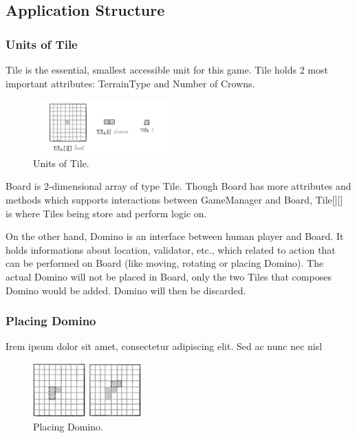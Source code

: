 \documentclass[conference]{IEEEtran}
\begin{document}
\subsection{Application Structure}

\subsubsection{Units of Tile}

Tile is the essential, smallest accessible unit for this game. Tile holds 2
most important attributes: TerrainType and Number of Crowns.

\begin{figure}[htbp]
    \centerline{\includegraphics[width=0.48\textwidth]{assets/unit.png}}
    \caption{Units of Tile.}\label{fig:unit}
\end{figure}

Board is 2-dimensional array of type Tile. Though Board has more attributes and
methods which supports interactions between GameManager and Board, Tile[][] is
where Tiles being store and perform logic on.

On the other hand, Domino is an interface between human player and Board. It
holds informations about location, validator, etc., which related to action
that can be performed on Board (like moving, rotating or placing Domino). The
actual Domino will not be placed in Board, only the two Tiles that composes
Domino would be added. Domino will then be discarded.

\subsubsection{Placing Domino}

Irem ipsum dolor sit amet, consectetur adipiscing elit. Sed ac nunc nec nisl

\begin{figure}[htbp]
    \centerline{\includegraphics[width=0.18\textwidth]{assets/placing-1.png}}
    \centerline{\includegraphics[width=0.18\textwidth]{assets/placing-2.png}}
    \caption{Placing Domino.}\label{fig:placing}
\end{figure}
\end{document}

